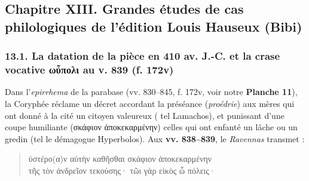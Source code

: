 \documentclass[11pt, a4paper, twoside]{article}
\renewcommand{\_}{\origunderscore\penalty0\relax}
\renewcommand{\texttt}[1]{#1}
\newcommand{\Bibi}{\textit{Bibi}}
\newcommand{\auDessus}[2]{\ensuremath{\overset{\text{#2}}{\text{#1}}}}
\def\Bibi{Bibi}%
\def\auDessus#1#2{#1(#2)}%
\begin{document}
\subsection{Chapitre XIII. Grandes études de cas philologiques de l'édition Louis Hauseux (\Bibi{})}


\subsubsection{13.1. La datation de la pièce en 410 av. J.-C. et la crase vocative \texttt{ωὖπολι} au v. 839 (\texttt{f. 172v})}

Dans l'\textit{epirrhema} de la parabase (\texttt{vv. 830–845}, \texttt{f. 172v}, voir notre \textbf{Planche 11}), la Coryphée réclame un décret accordant la préséance (\textit{proédrie}) aux mères qui ont donné à la cité un citoyen valeureux ( tel Lamachos), et punissant d'une coupe humiliante (\texttt{σκάφιον ἀποκεκαρμένην}) celles qui ont enfanté un lâche ou un gredin (tel le démagogue Hyperbolos). Aux \textbf{vv. 838–839}, le \textit{Ravennas} transmet :
\begin{quote}
\texttt{ὑστέρ\auDessus{ο}{α}ν αὐτὴν καθῆσθαι σκάφιον ἀποκεκαρμένην}\\
\texttt{τῆς τὸν ἀνδρεῖον τεκούσης· τῶι γὰρ εἰκὸς ὦ πόλεις·}\\
\end{quote}
\end{document}
